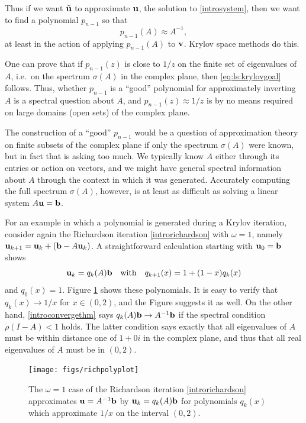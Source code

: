 Thus if we want $\tilde{\mathbf{u}}$ to approximate $\mathbf{u}$, the solution to \eqref{introsystem}, then we want to find a polynomial $p_{n-1}$ so that
\begin{equation}
    p_{n-1}(A) \approx A^{-1},  \label{eq:ls:krylovgoal}
\end{equation}
at least in the action of applying $p_{n-1}(A)$ to $\mathbf{v}$.  Krylov space methods do this.

One can prove that if $p_{n-1}(z)$ is close to $1/z$ on the finite set of eigenvalues of $A$, i.e.~on the spectrum $\sigma(A)$ in the complex plane, then \eqref{eq:ls:krylovgoal} follows.  Thus, whether $p_{n-1}$ is a ``good'' polynomial for approximately inverting $A$ is a spectral question about $A$, and $p_{n-1}(z) \approx 1/z$ is by no means required on large domains (open sets) of the complex plane.

The construction of a ``good'' $p_{n-1}$ would be a question of approximation theory on finite subsets of the complex plane if only the spectrum $\sigma(A)$ were known, but in fact that is asking too much.  We typically know $A$ either through its entries or action on vectors, and we might have general spectral information about $A$ through the context in which it was generated.   Accurately computing the full spectrum $\sigma(A)$, however, is at least as difficult as solving a linear system $A\mathbf{u}=\mathbf{b}$.

For an example in which a polynomial is generated during a Krylov iteration, consider again the Richardson iteration \eqref{introrichardson} with $\omega=1$, namely $\mathbf{u}_{k+1} = \mathbf{u}_k + (\mathbf{b} - A \mathbf{u}_k)$.  A straightforward calculation starting with $\mathbf{u}_0=\mathbf{b}$ shows
\begin{equation}
	\mathbf{u}_k = q_k(A) \mathbf{b} \quad \text{with} \quad q_{k+1}(x) = 1 + (1-x) q_k(x)  \label{richpolys}
\end{equation}
and $q_0(x)=1$.
Figure \ref{fig:richpolyplot} shows these polynomials.  It is easy to verify that $q_k(x) \to 1/x$ for $x\in (0,2)$, and the Figure suggests it as well.  On the other hand, \eqref{introconvergethm} says $q_k(A) \mathbf{b} \to A^{-1} \mathbf{b}$ if the spectral condition $\rho(I-A)<1$ holds.  The latter condition says exactly that all eigenvalues of $A$ must be within distance one of $1+0i$ in the complex plane, and thus that all real eigenvalues of $A$ must be in $(0,2)$.

\begin{figure}
\bigskip
\texttt{[image: figs/richpolyplot]}
\caption{The $\omega=1$ case of the Richardson iteration \eqref{introrichardson} approximates $\mathbf{u}=A^{-1}\mathbf{b}$ by $\mathbf{u}_k=q_k(A)\mathbf{b}$ for polynomials $q_k(x)$ which approximate $1/x$ on the interval $(0,2)$.}
\label{fig:richpolyplot}
\end{figure}

